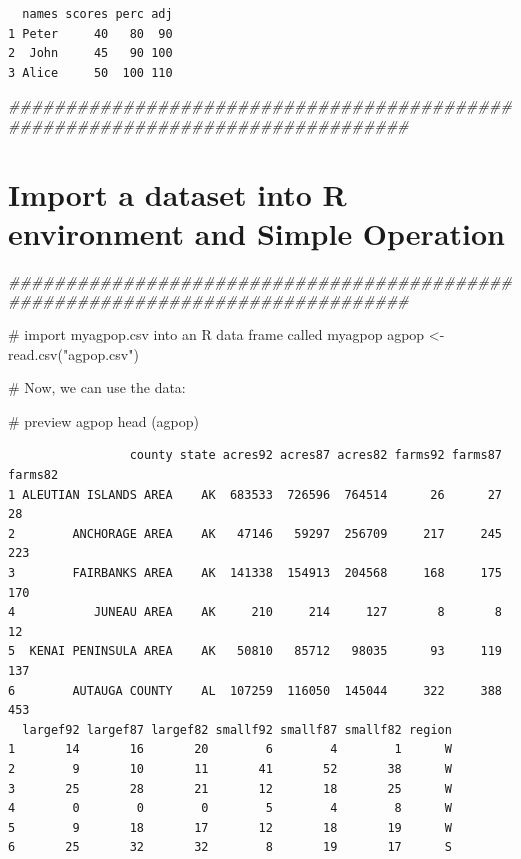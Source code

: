 \documentclass[
  letterpaper,
]{scrbook}
\newenvironment{Shaded}{\begin{snugshade}}{\end{snugshade}}
\newcommand{\CommentTok}[1]{\textcolor[rgb]{0.37,0.37,0.37}{#1}}
\newcommand{\DocumentationTok}[1]{\textcolor[rgb]{0.37,0.37,0.37}{\textit{#1}}}
\newcommand{\FunctionTok}[1]{\textcolor[rgb]{0.28,0.35,0.67}{#1}}
\newcommand{\NormalTok}[1]{\textcolor[rgb]{0.00,0.23,0.31}{#1}}
\newcommand{\OtherTok}[1]{\textcolor[rgb]{0.00,0.23,0.31}{#1}}
\newcommand{\StringTok}[1]{\textcolor[rgb]{0.13,0.47,0.30}{#1}}
\begin{document}
\begin{verbatim}
  names scores perc adj
1 Peter     40   80  90
2  John     45   90 100
3 Alice     50  100 110
\end{verbatim}

\begin{Shaded}
\begin{Highlighting}[]
\DocumentationTok{\#\#\#\#\#\#\#\#\#\#\#\#\#\#\#\#\#\#\#\#\#\#\#\#\#\#\#\#\#\#\#\#\#\#\#\#\#\#\#\#\#\#\#\#\#\#\#\#\#\#\#\#\#\#\#\#\#\#\#\#\#\#\#\#\#\#\#\#\#\#\#\#\#\#\#\#\#\#\#}
\end{Highlighting}
\end{Shaded}

\section{Import a dataset into R environment and Simple
Operation}\label{import-a-dataset-into-r-environment-and-simple-operation}

\begin{Shaded}
\begin{Highlighting}[]
\DocumentationTok{\#\#\#\#\#\#\#\#\#\#\#\#\#\#\#\#\#\#\#\#\#\#\#\#\#\#\#\#\#\#\#\#\#\#\#\#\#\#\#\#\#\#\#\#\#\#\#\#\#\#\#\#\#\#\#\#\#\#\#\#\#\#\#\#\#\#\#\#\#\#\#\#\#\#\#\#\#\#\#}

\CommentTok{\# import myagpop.csv into an R data frame called \textquotesingle{}myagpop\textquotesingle{}}
\NormalTok{agpop }\OtherTok{\textless{}{-}} \FunctionTok{read.csv}\NormalTok{(}\StringTok{"agpop.csv"}\NormalTok{)}

\CommentTok{\# Now, we can use the data:}

\CommentTok{\# preview agpop}
\FunctionTok{head}\NormalTok{ (agpop)}
\end{Highlighting}
\end{Shaded}

\begin{verbatim}
                 county state acres92 acres87 acres82 farms92 farms87 farms82
1 ALEUTIAN ISLANDS AREA    AK  683533  726596  764514      26      27      28
2        ANCHORAGE AREA    AK   47146   59297  256709     217     245     223
3        FAIRBANKS AREA    AK  141338  154913  204568     168     175     170
4           JUNEAU AREA    AK     210     214     127       8       8      12
5  KENAI PENINSULA AREA    AK   50810   85712   98035      93     119     137
6        AUTAUGA COUNTY    AL  107259  116050  145044     322     388     453
  largef92 largef87 largef82 smallf92 smallf87 smallf82 region
1       14       16       20        6        4        1      W
2        9       10       11       41       52       38      W
3       25       28       21       12       18       25      W
4        0        0        0        5        4        8      W
5        9       18       17       12       18       19      W
6       25       32       32        8       19       17      S
\end{verbatim}
\end{document}

